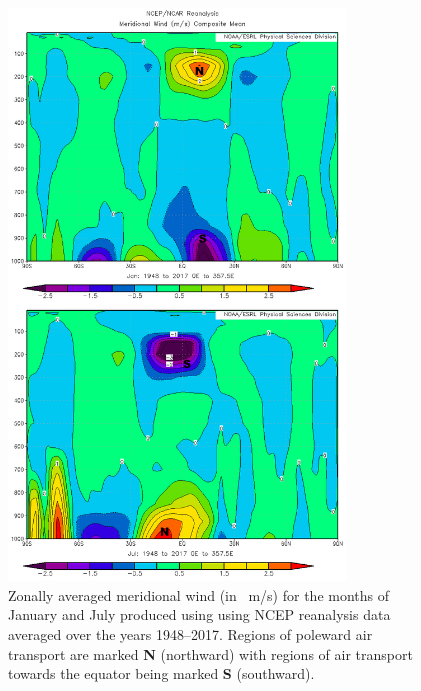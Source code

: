\documentclass[11pt]{article}
\begin{document}
\begin{figure}[h!]
  \centering
  \includegraphics[width=0.8\textwidth]{mer_wind_janjul.png}
  \caption{Zonally averaged meridional wind (in \SI{}{\m/\s}) for the months of January and July produced using using NCEP reanalysis data averaged over the years 1948--2017. Regions of poleward air transport are marked \textbf{N} (northward) with regions of air transport towards the equator being marked \textbf{S} (southward).}
  \label{fig:mer_wind}
\end{figure}
\end{document}
